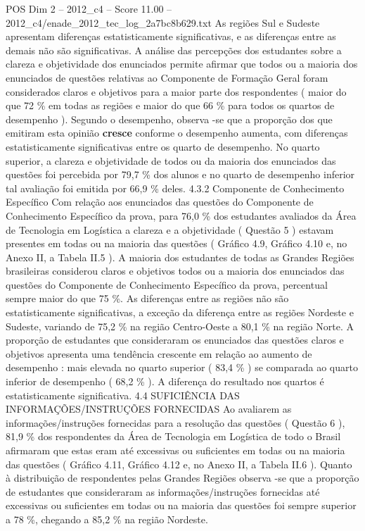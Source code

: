 \begin{textsample}{POS Dim 2 – 2012\_c4 – Score 11.00 – 2012\_c4/enade\_2012\_tec\_log\_2a7bc8b629.txt}
As regiões Sul e Sudeste apresentam diferenças estatisticamente significativas, e as diferenças entre as demais não são significativas.
A análise das percepções dos estudantes sobre a clareza e objetividade dos enunciados permite afirmar que todos ou a maioria dos enunciados de questões relativas ao Componente de Formação Geral foram considerados claros e objetivos para a maior parte dos respondentes ( maior do que 72 \% em todas as regiões e maior do que 66 \% para todos os quartos de desempenho ).
Segundo o desempenho, observa -se que a proporção dos que emitiram esta opinião \textbf{cresce} conforme o desempenho aumenta, com diferenças estatisticamente significativas entre os quarto de desempenho.
No quarto superior, a clareza e objetividade de todos ou da maioria dos enunciados das questões foi percebida por 79,7 \% dos alunos e no quarto de desempenho inferior tal avaliação foi emitida por 66,9 \% deles. 4.3.2 Componente de Conhecimento Específico Com relação aos enunciados das questões do Componente de Conhecimento Específico da prova, para 76,0 \% dos estudantes avaliados da Área de Tecnologia em Logística a clareza e a objetividade ( Questão 5 ) estavam presentes em todas ou na maioria das questões ( Gráfico 4.9, Gráfico 4.10 e, no Anexo II, a Tabela II.5 ).
A maioria dos estudantes de todas as Grandes Regiões brasileiras considerou claros e objetivos todos ou a maioria dos enunciados das questões do Componente de Conhecimento Específico da prova, percentual sempre maior do que 75 \%.
As diferenças entre as regiões não são estatisticamente significativas, a exceção da diferença entre as regiões Nordeste e Sudeste, variando de 75,2 \% na região Centro-Oeste a 80,1 \% na região Norte.
A proporção de estudantes que consideraram os enunciados das questões claros e objetivos apresenta uma tendência crescente em relação ao aumento de desempenho : mais elevada no quarto superior ( 83,4 \% ) se comparada ao quarto inferior de desempenho ( 68,2 \% ).
A diferença do resultado nos quartos é estatisticamente significativa. 4.4 SUFICIÊNCIA DAS INFORMAÇÕES/INSTRUÇÕES FORNECIDAS Ao avaliarem as informações/instruções fornecidas para a resolução das questões ( Questão 6 ), 81,9 \% dos respondentes da Área de Tecnologia em Logística de todo o Brasil afirmaram que estas eram até excessivas ou suficientes em todas ou na maioria das questões ( Gráfico 4.11, Gráfico 4.12 e, no Anexo II, a Tabela II.6 ).
Quanto à distribuição de respondentes pelas Grandes Regiões observa -se que a proporção de estudantes que consideraram as informações/instruções fornecidas até excessivas ou suficientes em todas ou na maioria das questões foi sempre superior a 78 \%, chegando a 85,2 \% na região Nordeste.

\end{textsample}
